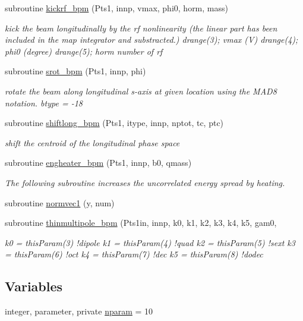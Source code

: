 \begin{DoxyCompactItemize}
subroutine \mbox{\hyperlink{namespacebpmclass_aee456e0f63daad3cb6eaba1bc99c948f}{kickrf\+\_\+bpm}} (Pts1, innp, vmax, phi0, horm, mass)
\begin{DoxyCompactList}\small\item\em kick the beam longitudinally by the rf nonlinearity (the linear part has been included in the map integrator and substracted.) drange(3); vmax (V) drange(4); phi0 (degree) drange(5); horm number of rf \end{DoxyCompactList}\item 
subroutine \mbox{\hyperlink{namespacebpmclass_ac8a2c78d2492dbd541f495bb0fd4840a}{srot\+\_\+bpm}} (Pts1, innp, phi)
\begin{DoxyCompactList}\small\item\em rotate the beam along longitudinal s-\/axis at given location using the M\+A\+D8 notation. btype = -\/18 \end{DoxyCompactList}\item 
subroutine \mbox{\hyperlink{namespacebpmclass_a3103b28e39ab8412e237df545aca9a71}{shiftlong\+\_\+bpm}} (Pts1, itype, innp, nptot, tc, ptc)
\begin{DoxyCompactList}\small\item\em shift the centroid of the longitudinal phase space \end{DoxyCompactList}\item 
subroutine \mbox{\hyperlink{namespacebpmclass_a8dac48fd52502e9f007f96a30003e1c8}{engheater\+\_\+bpm}} (Pts1, innp, b0, qmass)
\begin{DoxyCompactList}\small\item\em The following subroutine increases the uncorrelated energy spread by heating. \end{DoxyCompactList}\item 
subroutine \mbox{\hyperlink{namespacebpmclass_ab4b58d389b1b0c7169a20e75f2f32389}{normvec1}} (y, num)
\item 
subroutine \mbox{\hyperlink{namespacebpmclass_a53e45bf561ab6326ac3af0941f0a9ab4}{thinmultipole\+\_\+bpm}} (Pts1in, innp, k0, k1, k2, k3, k4, k5, gam0,
\begin{DoxyCompactList}\small\item\em k0 = thisParam(3) !dipole k1 = thisParam(4) !quad k2 = thisParam(5) !sext k3 = thisParam(6) !oct k4 = thisParam(7) !dec k5 = thisParam(8) !dodec \end{DoxyCompactList}\end{DoxyCompactItemize}
\subsection*{Variables}
\begin{DoxyCompactItemize}
\item 
integer, parameter, private \mbox{\hyperlink{namespacebpmclass_ac2f2f373976236d08c9c68de895950eb}{nparam}} = 10
\end{DoxyCompactItemize}



